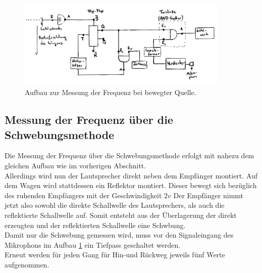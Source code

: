 \begin{figure}
	\includegraphics[width=0.9\textwidth]{Bilder/frequenzmessung_schaltung.png}
	\caption{Aufbau zur Messung der Frequenz bei bewegter Quelle.}
	\label{fig:delphin}
\end{figure}

\FloatBarrier
\subsection{Messung der Frequenz über die Schwebungsmethode}
Die Messung der Frequenz über die Schwebungsmethode erfolgt mit nahezu dem gleichen Aufbau wie im vorherigen Abschnitt.\\
Allerdings wird nun der Lautsprecher direkt neben dem Empfänger montiert.
Auf dem Wagen wird stattdessen ein Reflektor montiert. Dieser bewegt sich bezüglich des ruhenden Empfängers mit der Geschwindigkeit $2v$
Der Empfänger nimmt jetzt also sowohl die direkte Schallwelle des Lautsprechers, als auch die reflektierte Schallwelle auf.
Somit entsteht aus der Überlagerung der direkt erzeugten und der reflektierten Schallwelle eine Schwbung.\\
Damit nur die Schwebung gemessen wird, muss vor den Signaleingang des Mikrophons im Aufbau \ref{fig:delphin} ein Tiefpass geschaltet werden.\\
Erneut werden für jeden Gang für Hin-und Rückweg jeweils fünf Werte aufgenommen.
